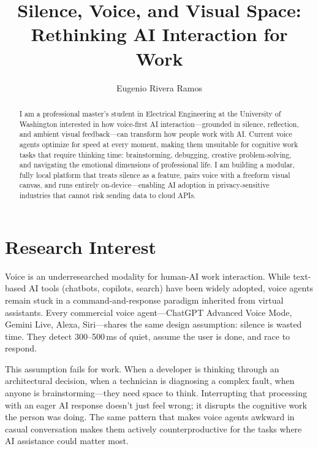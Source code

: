 \documentclass[manuscript,anonymous=false]{acmart}
\begin{document}
\title{Silence, Voice, and Visual Space: Rethinking AI Interaction for Work}

\author{Eugenio Rivera Ramos}

\begin{abstract}
I am a professional master's student in Electrical Engineering at the University of Washington interested in how voice-first AI interaction---grounded in silence, reflection, and ambient visual feedback---can transform how people work with AI. Current voice agents optimize for speed at every moment, making them unsuitable for cognitive work tasks that require thinking time: brainstorming, debugging, creative problem-solving, and navigating the emotional dimensions of professional life. I am building a modular, fully local platform that treats silence as a feature, pairs voice with a freeform visual canvas, and runs entirely on-device---enabling AI adoption in privacy-sensitive industries that cannot risk sending data to cloud APIs.
\end{abstract}

\maketitle

\section{Research Interest}

Voice is an underresearched modality for human-AI work interaction. While text-based AI tools (chatbots, copilots, search) have been widely adopted, voice agents remain stuck in a command-and-response paradigm inherited from virtual assistants. Every commercial voice agent---ChatGPT Advanced Voice Mode, Gemini Live, Alexa, Siri---shares the same design assumption: silence is wasted time. They detect 300--500\,ms of quiet, assume the user is done, and race to respond.

This assumption fails for work. When a developer is thinking through an architectural decision, when a technician is diagnosing a complex fault, when anyone is brainstorming---they need space to think. Interrupting that processing with an eager AI response doesn't just feel wrong; it disrupts the cognitive work the person was doing. The same pattern that makes voice agents awkward in casual conversation makes them actively counterproductive for the tasks where AI assistance could matter most.
\end{document}
